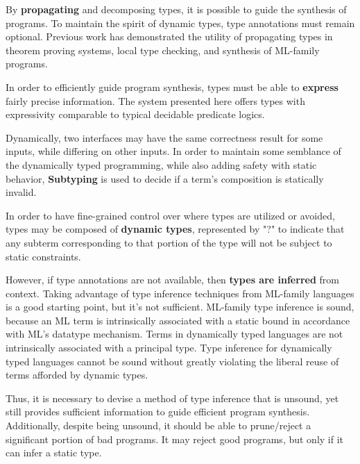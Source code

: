 \documentclass[sigplan,screen]{acmart}
\begin{document}
By \textbf{propagating} and decomposing types, 
it is possible to guide the synthesis of programs.
To maintain the spirit of dynamic types, type annotations must remain optional.
Previous work has demonstrated the utility of propagating types 
in theorem proving systems, local type checking, 
and synthesis of ML-family programs.

In order to efficiently guide program synthesis, 
types must be able to \textbf{express} fairly precise information. 
The system presented here offers types with 
expressivity comparable to typical decidable predicate logics. 

Dynamically, two interfaces may have the same correctness result for some inputs,
while differing on other inputs.  
In order to maintain some semblance of the dynamically typed programming,
while also adding safety with static behavior,  
\textbf{Subtyping} is used to decide if a term's 
composition is statically invalid.   


In order to have fine-grained control over where types are utilized or avoided, 
types may be composed of \textbf{dynamic types}, represented by "?" to indicate 
that any subterm corresponding to that portion of the type 
will not be subject to static constraints.

However, if type annotations are not available, then \textbf{types are inferred} from context. 
Taking advantage of type inference techniques from ML-family languages is a good starting point,
but it's not sufficient. ML-family type inference is sound, because an ML term is 
intrinsically associated with a static bound in accordance with ML's datatype mechanism.
Terms in dynamically typed languages are not intrinsically associated with a principal type. 
Type inference for dynamically typed languages cannot be sound without greatly violating the 
liberal reuse of terms afforded by dynamic types. 

Thus, it is necessary to devise a method of type inference that is unsound, 
yet still provides sufficient information to guide efficient program synthesis.
Additionally, despite being unsound, it should be able to prune/reject 
a significant portion of bad programs. 
It may reject good programs, but only if it can infer a static type.
\end{document}
